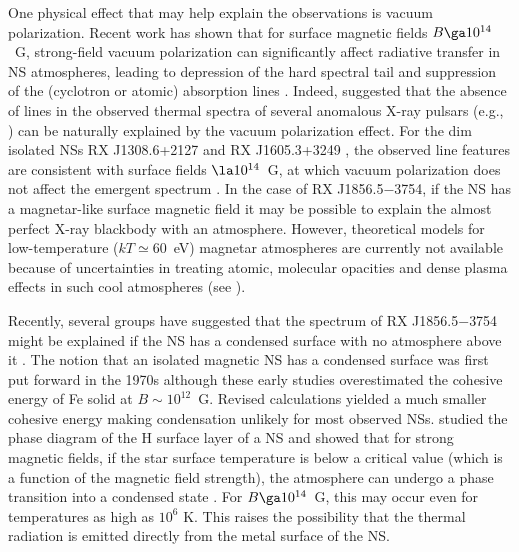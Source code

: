 \documentclass{emulateapj}
\begin{document}
One physical effect that may help explain the observations is vacuum
polarization. Recent work has shown
that for surface magnetic fields $B\ga 10^{14}$~G, strong-field vacuum
polarization can significantly affect radiative transfer in NS atmospheres,
leading to depression of the hard spectral tail and suppression of the
(cyclotron or atomic) absorption lines 
\citep{LaiHo02,LaiHo03a,HoLai03,HoLai04,Ho-ea03,lloyd03}.
Indeed, \citet{HoLai03}
suggested that the absence of lines in the observed thermal spectra of
several anomalous X-ray pulsars
(e.g., \citealt{juettetal02,tiengoetal02,moriietal03,pateletal03}) 
can be naturally explained by the vacuum polarization effect.
For the dim isolated NSs RX J1308.6+2127 \citep{Haberl-ea03}
and RX J1605.3+3249 \citep{Kerkwijk04}, the observed line features
are consistent with surface fields $\la 10^{14}$~G, at which 
vacuum polarization does not affect the emergent spectrum
\citep{HoLai04}. In the case of RX J1856.5$-$3754, 
if the NS has a magnetar-like surface magnetic field 
\citep[see][]{MoriRuderman} 
it may be possible to explain the almost 
perfect X-ray blackbody with an atmosphere.
However, theoretical models for 
low-temperature ($kT\simeq 60$~eV) magnetar atmospheres 
are currently not available because of uncertainties in 
treating atomic, molecular opacities and dense plasma effects
in such cool atmospheres (see \citealt{Ho-ea03,PC03,PC04}).

Recently, several groups have suggested that the spectrum of RX J1856.5$-$3754 
might be explained if the NS has a condensed surface with no atmosphere
above it 
\citep{Burwitz-ea01,Burwitz-ea03,MoriRuderman,Turolla-ea}.
The notion that an isolated magnetic NS has a 
condensed surface was first put forward in the 1970s 
\citep[see][]{Ruderman71,Flowers-ea}
although these early studies overestimated the cohesive energy of Fe
solid at $B\sim 10^{12}$~G. Revised calculations yielded a much smaller
cohesive energy
\citep{mueller84,Jones,Neuhauser-ea}
making condensation unlikely for most observed NSs.
\citet{LS97} studied the phase diagram of the H surface layer of
a NS and showed that for strong magnetic fields, if the star 
surface temperature is below a critical value (which is a function of 
the magnetic field strength), the atmosphere can undergo a phase
transition into a condensed state \citep[see also][]{Lai01}.
For $B\ga 10^{14}$~G, this may occur even for temperatures as 
high as $10^{6}$ K.  This raises the possibility that the thermal 
radiation is emitted directly from the metal surface of the NS.
\end{document}
